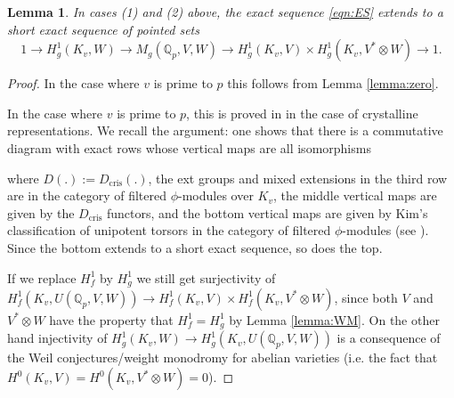 \documentclass[11pt]{amsart}
\def\Q{\mathbb Q}
\theoremstyle{plain}
\newtheorem{lemma}{Lemma}
\theoremstyle{definition}
\DeclareMathOperator{\dR}{dR}
\newcommand{\cris}{\mathrm{cris}}
\DeclareMathOperator{\ext}{Ext}
\begin{document}
\begin{lemma}\label{lemma:SES}
In cases (1) and (2) above, the exact sequence \eqref{eqn:ES} extends to a short exact sequence of pointed sets
\[
1\to H^1 _g (K _v ,W)\to M_g (\Q _p ,V,W)\to H^1 _g (K_v ,V)\times H^1 _g (K_v ,V^* \otimes W) \to 1.
\]
\end{lemma}
\begin{proof}
In the case where $v$ is prime to $p$ this follows from Lemma \ref{lemma:zero}.

In the case where $v$ is prime to $p$, this is proved in \cite{QC2} in the case of crystalline representations. We recall the argument: one shows that there is a commutative diagram with exact rows whose vertical maps are all isomorphisms
\begin{small}
\end{small}
where $D(.):=D_{\cris }(.)$, the ext groups and mixed extensions in the third row are in the category of filtered $\phi $-modules over $K_v$, the middle vertical maps are given by the $D_{\cris }$ functors, and the bottom vertical maps are given by Kim's classification of unipotent torsors in the category of filtered $\phi $-modules (see \cite[\S 3.3]{QC2}). Since the bottom extends to a short exact sequence, so does the top.

If we replace $H^1 _f $ by $H^1 _g$ we still get surjectivity of $H^1_f (K_v ,U(\Q _p ,V,W)) \to H^1 _f (K_v ,V)\times H^1 _f (K_v ,V^* \otimes W) $, since both $V$ and $V^* \otimes W$ have the property that $H^1 _f =H^1 _g $ by Lemma \ref{lemma:WM}. On the other hand injectivity of $H^1 _g (K_v ,W)\to H^1 _g (K_v ,U(\Q _p ,V,W))$ is a consequence of the Weil conjectures/weight monodromy for abelian varieties (i.e. the fact that $H^0 (K_v ,V)=H^0 (K_v ,V^* \otimes W)=0$).
\end{proof}
\end{document}

